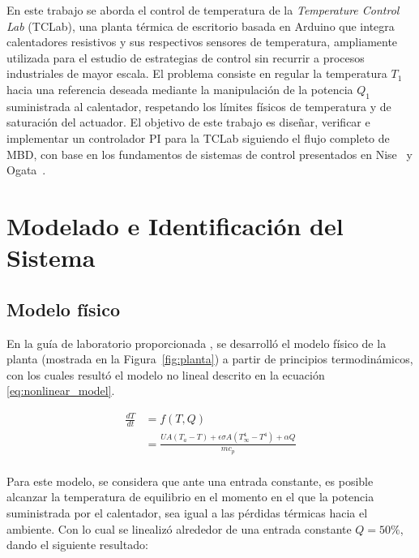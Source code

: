 \documentclass[journal]{IEEEtran}
\begin{document}
En este trabajo se aborda el control de temperatura de la \textit{Temperature Control Lab} (TCLab), una
planta térmica de escritorio basada en Arduino que integra calentadores resistivos y sus respectivos
sensores de temperatura, ampliamente utilizada para el estudio de estrategias de control sin recurrir a
procesos industriales de mayor escala. El problema consiste en regular la temperatura $T_1$ hacia una
referencia deseada mediante la manipulación de la potencia $Q_1$ suministrada al calentador, respetando
los límites físicos de temperatura y de saturación del actuador. El objetivo de este trabajo es diseñar,
verificar e implementar un controlador PI para la TCLab siguiendo el flujo completo de MBD, con base en
los fundamentos de sistemas de control presentados en Nise~\cite{nise_control} y Ogata~\cite{ogata_control}.
\section{Modelado e Identificación del Sistema}
\subsection{Modelo físico}
En la guía de laboratorio proporcionada \cite{guia_tclab_2026}, se desarrolló el modelo físico de la planta (mostrada en la Figura~\ref{fig:planta}) 
a partir de principios termodinámicos, con los cuales resultó el modelo no lineal descrito en la ecuación \ref{eq:nonlinear_model}.

\begin{equation}
        \begin{aligned}
                \frac{dT}{dt} &= f(T, Q) \\
                              &= \frac{U A (T_a - T) + \epsilon \sigma A (T_{\infty}^4 - T^4) + \alpha Q}{m c_p} \\
        \end{aligned}
\label{eq:nonlinear_model}
\end{equation}

Para este modelo, se considera que ante una entrada constante, es posible alcanzar la temperatura de equilibrio en el momento
en el que la potencia suministrada por el calentador, sea igual a las pérdidas térmicas hacia el ambiente. Con lo cual se 
linealizó alrededor de una entrada constante $Q = 50\%$, dando el siguiente resultado: 
\end{document}
